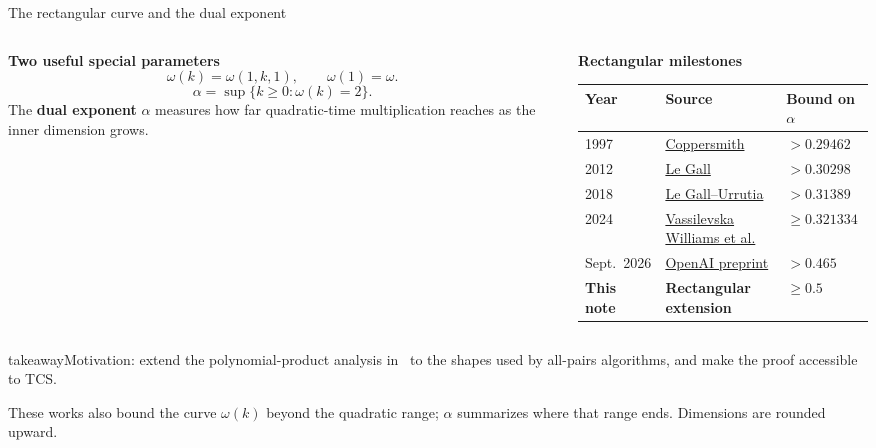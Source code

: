 \documentclass[aspectratio=169,11pt]{beamer}
\newcommand{\source}[1]{\vfill\par{\fontsize{7.5}{9}\selectfont\color{muted}#1\par}}
\newcommand{\takeaway}[1]{\begin{beamercolorbox}[sep=0.65em,wd=\linewidth]{takeaway}#1\end{beamercolorbox}}
\begin{document}
\begin{frame}{The rectangular curve and the dual exponent}
  \begin{columns}[T,onlytextwidth]
    \begin{column}{0.43\textwidth}
      \textbf{Two useful special parameters}
      \[
        \omega(k)=\omega(1,k,1),\qquad\omega(1)=\omega.
      \]
      \[
        \alpha=\sup\{k\ge0:\omega(k)=2\}.
      \]
      The \textbf{dual exponent} $\alpha$ measures how far quadratic-time
      multiplication reaches as the inner dimension grows.
    \end{column}
    \begin{column}{0.53\textwidth}
      \textbf{Rectangular milestones}\par\smallskip
      {\footnotesize
      \setlength{\tabcolsep}{3pt}
      \renewcommand{\arraystretch}{1.15}
      \begin{tabular}{@{}lll@{}}
        \toprule
        Year & Source & Bound on $\alpha$\\
        \midrule
        1997 & \href{https://doi.org/10.1006/jcom.1997.0438}{Coppersmith} & $>0.29462$\\
        2012 & \href{https://arxiv.org/abs/1204.1111}{Le Gall} & $>0.30298$\\
        2018 & \href{https://arxiv.org/abs/1708.05622}{Le Gall--Urrutia} & $>0.31389$\\
        2024 & \href{https://arxiv.org/abs/2307.07970}{Vassilevska Williams et al.} & $\ge0.321334$\\
        Sept.\ 2026 & \href{https://github.com/openai/math/tree/main/preprints/Complex-Matrix-Multiplication-Below-2.258-and-Rectangular-Bounds-September-24-2026}{OpenAI preprint} & $>0.465$\\
        \textbf{This note} & \textbf{Rectangular extension} & $\boldsymbol{\ge0.5}$\\
        \bottomrule
      \end{tabular}}
    \end{column}
  \end{columns}
  \medskip
  \takeaway{Motivation: extend the polynomial-product analysis in~\cite{nine-fourths}
  to the shapes used by all-pairs algorithms, and make the proof accessible to TCS.}
  \source{These works also bound the curve $\omega(k)$ beyond the quadratic range;
  $\alpha$ summarizes where that range ends.
  Dimensions are rounded upward.}
\end{frame}
\end{document}
